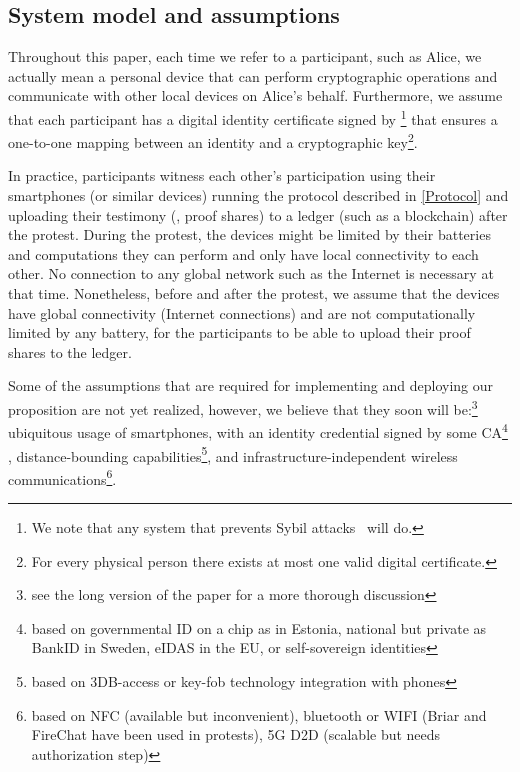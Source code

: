 \subsection{System model and assumptions}%
\label{assumptions}

Throughout this paper, each time we refer to a participant, such as Alice, we 
actually mean a personal device that can perform cryptographic operations and 
communicate with other local devices on Alice's behalf.
Furthermore, we assume that each participant has a digital identity certificate signed 
by \footnote{%
  We note that any system that prevents Sybil attacks~\cite{SybilAttack} will 
  do.
} that ensures a one-to-one mapping between an identity and a cryptographic 
key\footnote{%
  For every physical person there exists at most one valid digital certificate.
}.

In practice, participants witness each other's participation using
their smartphones (or similar devices) running the protocol described
in \cref{Protocol} and uploading their testimony (\ie, proof shares)
to a ledger (such as a blockchain) after the protest.  During the
protest, the devices might be limited by their batteries and
computations they can perform and only have local connectivity to each
other.  No connection to any global network such as the Internet is
necessary at that time.  Nonetheless, before and after the protest, we
assume that the devices have global connectivity (\ie Internet
connections) and are not computationally limited by any battery, for
the participants to be able to upload their proof shares to the
ledger.

Some of the assumptions that are required for implementing and deploying our proposition are 
not yet realized, however, we believe that they soon will
be:\footnote{see the long version of the paper for a more thorough discussion}
ubiquitous usage of smartphones, with an identity credential
signed by some \ac{CA}\footnote{based on \eg governmental ID on a chip as in Estonia, national
  but private as BankID in Sweden, eIDAS in the EU, or self-sovereign
  identities} ,  distance-bounding capabilities\footnote{based on \eg
  3DB-access or key-fob technology integration with phones}, and
infrastructure-independent wireless communications\footnote{based on
  \eg NFC (available but inconvenient), bluetooth or WIFI (Briar and
  FireChat have been used in protests), 5G D2D (scalable but needs
  authorization step)}. 


